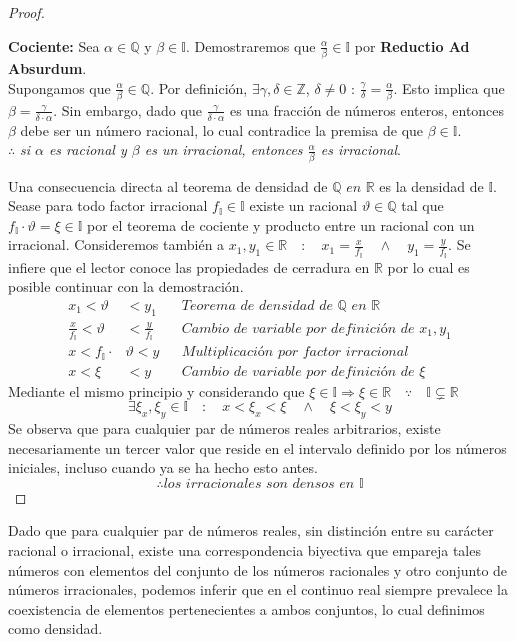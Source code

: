 \documentclass{article}
\begin{document}
\begin{proof}
\begin{mdframed}
\noindent \textbf{Cociente:}
\noindent Sea $\alpha \in \mathbb{Q}$ y $\beta \in \mathbb{I}$. Demostraremos que $\frac{\alpha}{\beta} \in \mathbb{I}$ por \textbf{Reductio Ad Absurdum}. \\
Supongamos que $\frac{\alpha}{\beta} \in \mathbb{Q}$. Por definición, $\exists \gamma,\delta \in \mathbb{Z}$, $\delta \neq 0 \textit{  :  } \frac{\gamma}{\delta} = \frac{\alpha}{\beta}$. Esto implica que $\beta = \frac{\gamma}{\delta \cdot \alpha}$. Sin embargo, dado que $\frac{\gamma}{\delta \cdot \alpha}$ es una fracción de números enteros, entonces $\beta$ debe ser un número racional, lo cual contradice la premisa de que $\beta \in \mathbb{I}$.\\
$\therefore$ \textit{si $\alpha$ es racional y $\beta$ es un irracional, entonces $\frac{\alpha}{\beta}$ es irracional}.
\end{mdframed}
    Una consecuencia directa al teorema de densidad de \(\mathbb{Q} \textit{  en  } \mathbb{R}\) es la densidad de \( \mathbb{I} \). Sease para todo factor irracional \(f_\mathbb{I} \in \mathbb{I}\) existe un racional \(\vartheta \in \mathbb{Q}\) tal que \(f_\mathbb{I} \cdot \vartheta = \xi \in \mathbb{I}\) por el teorema de cociente y producto entre un racional con un irracional. Consideremos también a \(x_1,y_1 \in \mathbb{R} \quad : \quad x_1 = \frac{x}{f_\mathbb{I}} \quad \land \quad y_1 = \frac{y}{f_\mathbb{I}}\). Se infiere que el lector conoce las propiedades de cerradura en \( \mathbb{R} \) por lo cual es posible continuar con la demostración.\\
    \begin{align*}
        x_1 < \vartheta &< y_1 && \textit{Teorema de densidad de  } \mathbb{Q} \textit{  en  } \mathbb{R} \\
        \frac{x}{f_\mathbb{I}} < \vartheta &< \frac{y}{f_\mathbb{I}} && \textit{Cambio de variable por definición de }x_1,y_1 \\
        x < f_\mathbb{I} \cdot &\vartheta < y && \textit{Multiplicación por factor irracional} \\
        x < \xi &< y && \textit{Cambio de variable por definición de }\xi
    \end{align*}
    Mediante el mismo principio y considerando que \( \xi \in \mathbb{I} \Rightarrow \xi \in \mathbb{R} \quad \because \quad \mathbb{I} \subsetneq \mathbb{R}\)
\[ \exists \xi_x,\xi_y \in \mathbb{I} \quad : \quad x < \xi_x < \xi \quad \land \quad \xi < \xi_y < y \]
Se observa que para cualquier par de números reales arbitrarios, existe necesariamente un tercer valor que reside en el intervalo definido por los números iniciales, incluso cuando ya se ha hecho esto antes.
    \[ \therefore \textit{los irracionales son densos en  } \mathbb{I} \]
\end{proof}
Dado que para cualquier par de números reales, sin distinción entre su carácter racional o irracional, existe una correspondencia biyectiva que empareja tales números con elementos del conjunto de los números racionales y otro conjunto de números irracionales, podemos inferir que en el continuo real siempre prevalece la coexistencia de elementos pertenecientes a ambos conjuntos, lo cual definimos como densidad.
\end{document}
